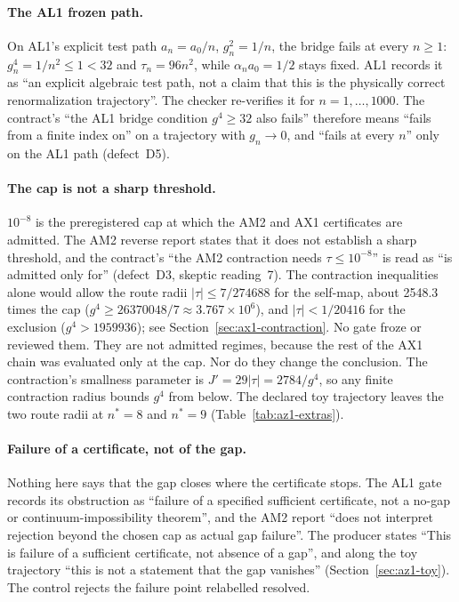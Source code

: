 \paragraph{The AL1 frozen path.}
On AL1's explicit test path $a_n=a_0/n$, $g_n^2=1/n$, the bridge fails at
every $n\ge1$: $g_n^4=1/n^2\le1<32$ and $\tau_n=96n^2$, while
$\alpha_na_0=1/2$ stays fixed. AL1 records it as ``an explicit algebraic test
path, not a claim that this is the physically correct renormalization
trajectory''. The checker re-verifies it for $n=1,\ldots,1000$. The contract's
``the AL1 bridge condition $g^4\ge32$ also fails'' therefore means ``fails
from a finite index on'' on a trajectory with $g_n\to0$, and ``fails at every
$n$'' only on the AL1 path (defect~D5).

\paragraph{The cap is not a sharp threshold.}
$10^{-8}$ is the preregistered cap at which the AM2 and AX1 certificates are
admitted. The AM2 reverse report states that it does not establish a sharp
threshold, and the contract's ``the AM2 contraction needs
$\tau\le10^{-8}$'' is read as ``is admitted only for'' (defect~D3, skeptic
reading~7). The contraction inequalities alone would allow the route radii
$|\tau|\le7/274688$ for the self-map, about 2548.3 times the cap
($g^4\ge26370048/7\approx3.767\times10^6$), and $|\tau|<1/20416$ for the
exclusion ($g^4>1959936$); see Section~\ref{sec:ax1-contraction}. No gate
froze or reviewed them. They are not admitted regimes, because the rest of
the AX1 chain was evaluated only at the cap. Nor do they change the
conclusion. The contraction's smallness parameter is
$J'=29|\tau|=2784/g^4$, so any finite contraction radius bounds $g^4$ from
below. The declared toy trajectory leaves the two route radii at $n^*=8$ and
$n^*=9$ (Table~\ref{tab:az1-extras}).

\paragraph{Failure of a certificate, not of the gap.}
Nothing here says that the gap closes where the certificate stops. The AL1
gate records its obstruction as ``failure of a specified sufficient
certificate, not a no-gap or continuum-impossibility theorem'', and the AM2
report ``does not interpret rejection beyond the chosen cap as actual gap
failure''. The producer states ``This is failure of a sufficient certificate,
not absence of a gap'', and along the toy trajectory ``this is not a
statement that the gap vanishes'' (Section~\ref{sec:az1-toy}). The control
 rejects the failure point relabelled
resolved.

